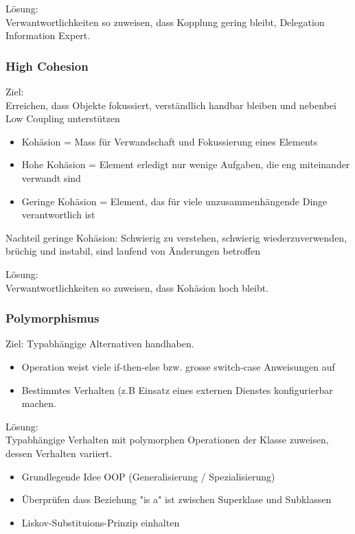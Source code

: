 \documentclass[../ZF_SWEN1.tex]{subfiles}
\begin{document}
Lösung:\\
Verwantwortlichkeiten so zuweisen, dass Kopplung gering bleibt, Delegation Information Expert.

\subsubsection{High Cohesion}

Ziel:\\
Erreichen, dass Objekte fokussiert, verständlich handbar bleiben und nebenbei Low Coupling unterstützen

\begin{itemize}
	\item Kohäsion = Mass für Verwandschaft und Fokussierung eines Elements
	\item Hohe Kohäsion = Element erledigt nur wenige Aufgaben, die eng miteinander verwandt sind
	\item Geringe Kohäsion = Element, das für viele unzusammenhängende Dinge verantwortlich ist
\end{itemize}

Nachteil geringe Kohäsion: Schwierig zu verstehen, schwierig wiederzuverwenden, brüchig und instabil, sind laufend von Änderungen betroffen

Lösung:\\
Verwantwortlichkeiten so zuweisen, dass Kohäsion hoch bleibt.



\subsubsection{Polymorphismus}

Ziel: Typabhängige Alternativen handhaben.
\begin{itemize}
	\item Operation weist viele if-then-else bzw. grosse switch-case Anweisungen auf
	\item Bestimmtes Verhalten (z.B Einsatz eines externen Dienstes konfigurierbar machen.
\end{itemize}

Lösung:\\
Typabhängige Verhalten mit polymorphen Operationen der Klasse zuweisen, dessen Verhalten variiert.
\begin{itemize}
	\item Grundlegende Idee OOP (Generalisierung / Spezialisierung)
	\item Überprüfen dass Beziehung "is a" ist zwischen Superklase und Subklassen
	\item Liskov-Substituions-Prinzip einhalten
\end{itemize}
\end{document}
